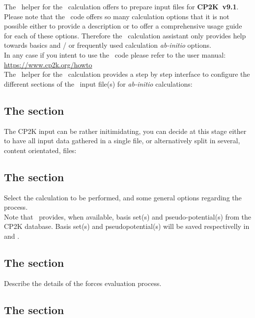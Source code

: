 The \atomes\ helper for the \cptk\ calculation offers to prepare input files for {\bf{CP2K~v9.1}}. 
Please note that the \cptk\ code offers so many calculation options that it is not possible either to provide a description 
or to offer a comprehensive usage guide for each of these options.  
Therefore the \cptk\ calculation assistant only provides help towards basics and / or frequently used calculation {\it{ab-initio}} options. \\[0.25cm]
In any case if you intent to use the \cptk\ code please refer to the user manual: \\[0.25cm]
\href{https://www.cp2k.org/howto}{https://www.cp2k.org/howto}\\[0.25cm]
The \atomes\ helper for the \cptk\ calculation provides a step by step interface to configure the different sections of the \cptk\ input file(s) for {\it{ab-initio}} calculations:

\subsection*{The  section}

The CP2K input can be rather initimidating, you can decide at this stage either to have all input data gathered in a single file, 
or alternatively split in several, content orientated, files:  


\subsection*{The  section}

Select the calculation to be performed, and some general options regarding the process. \\
Note that \atomes\ provides, when available, basis set(s) and pseudo-potential(s) from the CP2K database. 
Basis set(s) and pseudopotential(s) will be saved respectivelly in  and . 

\subsection*{The  section}

Describe the details of the forces evaluation process.

\subsection*{The  section}

